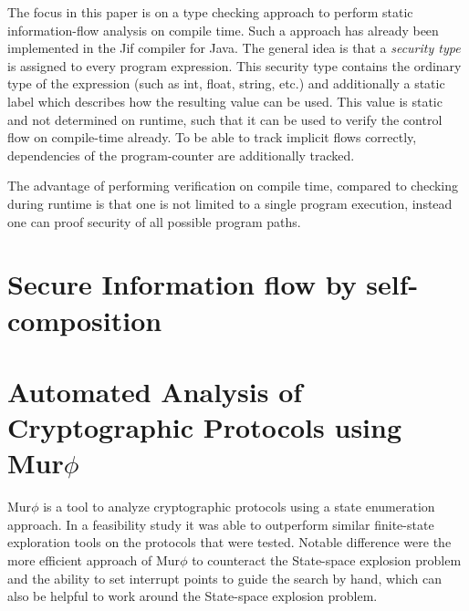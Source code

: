 \documentclass[a4paper,UKenglish]{lipics-v2018}
\def\murphi{Mur$\phi$ }
\begin{document}
The focus in this paper is on a type checking approach to perform static information-flow analysis on compile time. Such a approach has already been implemented in the Jif compiler for Java.\cite{JFlow} The general idea is that a \textit{security type} is assigned to every program expression. This security type contains the ordinary type of the expression (such as int, float, string, etc.) and additionally a static label which describes how the resulting value can be used. This value is static and not determined on runtime, such that it can be used to verify the control flow on compile-time already.\cite{language_based_information_flow_security}
To be able to track implicit flows correctly, dependencies of the program-counter are additionally tracked.

The advantage of performing verification on compile time, compared to checking during runtime is that one is not limited to a single program execution, instead one can proof security of all possible program paths.\cite{language_based_information_flow_security}




\newpage
\section{Secure Information flow by self-composition}



\newpage
\section{Automated Analysis of Cryptographic Protocols using \murphi}

\murphi is a tool to analyze cryptographic protocols using a state enumeration approach. In a feasibility study it was able to outperform similar finite-state exploration tools on the protocols that were tested. Notable difference were the more efficient approach of \murphi to counteract the State-space explosion problem and the ability to set interrupt points to guide the search by hand, which can also be helpful to work around the State-space explosion problem.\cite{murphi}
\end{document}
